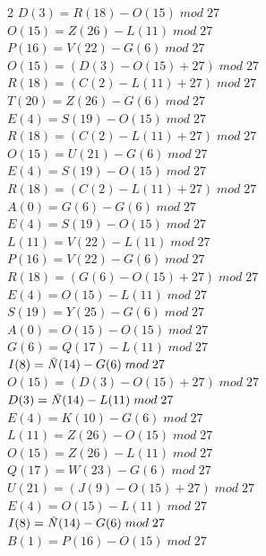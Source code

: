\documentclass{article}
\begin{document}
\begin{enumerate}
\begin{multicols}{2}
$D (3) = R (18) - O (15) \;  mod \; 27$\\
$O (15) = Z (26) - L (11) \;  mod \; 27$\\
$P (16) = V (22) - G (6) \;  mod \; 27$\\
$O (15) = (D (3) - O (15) + 27) \;  mod \; 27$\\
$R (18) = (C (2) - L (11)+ 27) \;  mod \; 27$\\
$T (20) = Z (26) - G (6) \;  mod \; 27$\\
$E (4) = S (19) - O (15) \;  mod \; 27$\\
$R (18) = (C (2) - L (11)+ 27) \;  mod \; 27$\\
$O (15) = U (21) - G (6) \;  mod \; 27$\\
$E (4) = S (19) - O (15) \;  mod \; 27$\\
$R (18) = (C (2) - L (11)+ 27) \;  mod \; 27$\\
$A (0) = G (6) - G (6) \;  mod \; 27$\\
$E (4) = S (19) - O (15) \;  mod \; 27$\\
$L (11) = V (22) - L (11) \;  mod \; 27$\\
$P (16) = V (22) - G (6) \;  mod \; 27$\\
$R (18) = (G (6) - O (15) + 27) \;  mod \; 27$\\
$E (4) = O (15) - L (11) \;  mod \; 27$\\
$S (19) = Y (25) - G (6) \;  mod \; 27$\\
$A (0) = O (15) - O (15) \;  mod \; 27$\\
$G (6) = Q (17) - L (11) \;  mod \; 27$\\
$I (8) = \text{\textit{Ñ}} (14) - G (6) \;  mod \; 27$\\
$O (15) = (D (3) - O (15) + 27) \;  mod \; 27$\\
$D (3) = \text{\textit{Ñ}} (14) - L (11) \;  mod \; 27$\\
$E (4) = K (10) - G (6) \;  mod \; 27$\\
$L (11) = Z (26) - O (15) \;  mod \; 27$\\
$O (15) = Z (26) - L (11) \;  mod \; 27$\\
$Q (17) = W (23) - G (6) \;  mod \; 27$\\
$U (21) = (J (9) - O (15) + 27) \;  mod \; 27$\\
$E (4) = O (15) - L (11) \;  mod \; 27$\\
$I (8) = \text{\textit{Ñ}} (14) - G (6) \;  mod \; 27$\\
$B (1) = P (16) - O (15)  \;  mod \; 27$\\

\end{multicols}
\end{enumerate}
\end{document}
